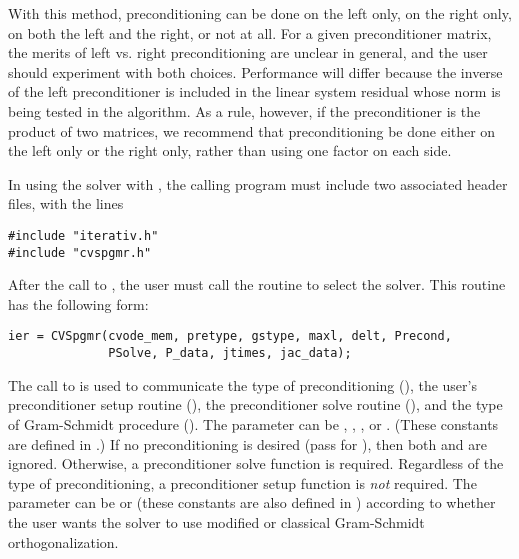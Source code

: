 \begin{itemize}
  With this {\spgmr} method, preconditioning can be done on the left only,
  on the right only, on both the left and the right, or not at all.  For
  a given preconditioner matrix, the merits of left vs. right
  preconditioning are unclear in general, and the user should experiment
  with both choices.  Performance will differ because the inverse of the
  left preconditioner is included in the linear system residual whose
  norm is being tested in the {\spgmr} algorithm.  As a rule, however, if
  the preconditioner is the product of two matrices, we recommend that
  preconditioning be done either on the left only or the right only,
  rather than using one factor on each side.
  
  In using the {\cvspgmr} solver with {\cvodes}, the calling program must
  include two associated header files, with the lines
\begin{verbatim}
#include "iterativ.h"
#include "cvspgmr.h"
\end{verbatim}
  \par After the call to , the user must call the routine 
  to select the {\cvdiag} solver. This routine has the following form:
\begin{verbatim}
ier = CVSpgmr(cvode_mem, pretype, gstype, maxl, delt, Precond, 
              PSolve, P_data, jtimes, jac_data);
\end{verbatim}
  
  The call to  is used to communicate the type of
  preconditioning (), the user's preconditioner setup
  routine (), the preconditioner solve routine (),
  and the type of Gram-Schmidt procedure (). The 
  parameter can be , , , or .
  (These constants are defined in .)  If no preconditioning
  is desired (pass  for ), then both  and
   are ignored.  Otherwise, a preconditioner solve function
   is required.  Regardless of the type of preconditioning,
  a preconditioner setup function  is {\em not} required. 
  The  parameter can be  or 
  (these constants are also defined in ) according to
  whether the user wants the {\cvspgmr} solver to use modified or classical
  Gram-Schmidt orthogonalization.
  

\end{itemize}
